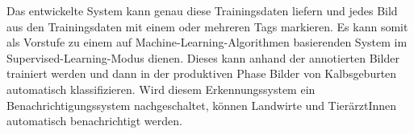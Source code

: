 Das entwickelte System kann genau diese Trainingsdaten liefern und jedes Bild aus den Trainingsdaten mit einem oder mehreren \glqq Tags\grqq{} markieren. Es kann somit als Vorstufe zu einem auf Machine-Learning-Algorithmen basierenden System im Supervised-Learning-Modus dienen. Dieses kann anhand der annotierten Bilder trainiert werden und dann in der produktiven Phase Bilder von Kalbsgeburten automatisch klassifizieren. Wird diesem Erkennungssystem ein Benachrichtigungssystem nachgeschaltet, können Landwirte und TierärztInnen automatisch benachrichtigt werden.